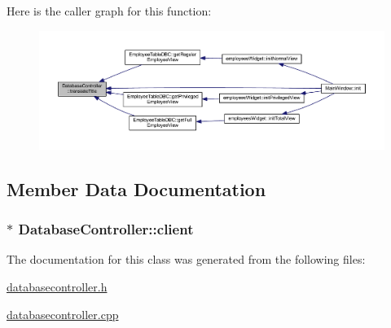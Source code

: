 Here is the caller graph for this function\+:
\nopagebreak
\begin{figure}[H]
\begin{center}
\leavevmode
\includegraphics[width=350pt]{class_database_controller_a109af166fcb6981fe31cd85a7525313c_icgraph}
\end{center}
\end{figure}




\subsection{Member Data Documentation}
\hypertarget{class_database_controller_a24945a9113a18ce10d4772aff2ce7873}{}
\subsubsection[{client}]{$\ast$ Database\+Controller\+::client\hspace{0.3cm}{\ttfamily [protected]}}\label{class_database_controller_a24945a9113a18ce10d4772aff2ce7873}


The documentation for this class was generated from the following files\+:\begin{DoxyCompactItemize}
\item 
\hyperlink{databasecontroller_8h}{databasecontroller.\+h}\item 
\hyperlink{databasecontroller_8cpp}{databasecontroller.\+cpp}\end{DoxyCompactItemize}
